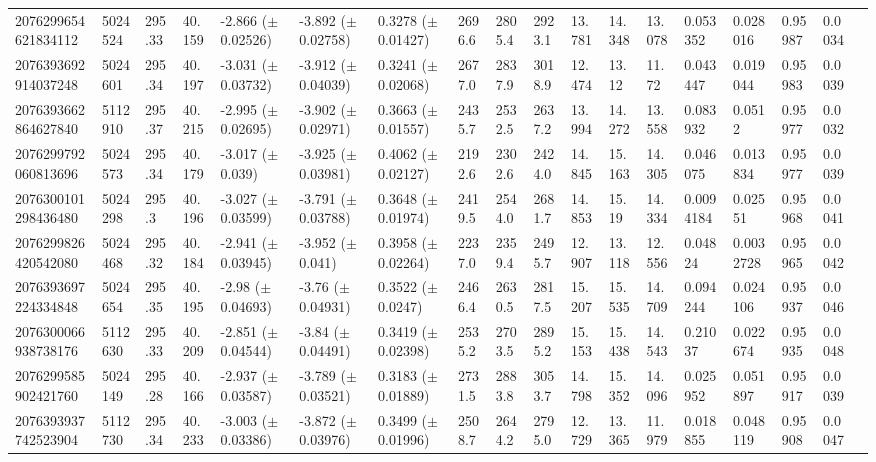 \begin{sidewaystable}[htbp]
{\begin{tabular}{llllllllllllllllll}
            2076299654621834112 & 5024524 & 295.33 & 40.159 & -2.866 ($\pm$ 0.02526) & -3.892 ($\pm$ 0.02758) & 0.3278 ($\pm$ 0.01427) & 2696.6 & 2805.4 & 2923.1 & 13.781 & 14.348 & 13.078 & 0.053352 & 0.028016 & 0.95987 & 0.0034 & \\
            2076393692914037248 & 5024601 & 295.34 & 40.197 & -3.031 ($\pm$ 0.03732) & -3.912 ($\pm$ 0.04039) & 0.3241 ($\pm$ 0.02068) & 2677.0 & 2837.9 & 3018.9 & 12.474 & 13.12 & 11.72 & 0.043447 & 0.019044 & 0.95983 & 0.0039 & \\
            2076393662864627840 & 5112910 & 295.37 & 40.215 & -2.995 ($\pm$ 0.02695) & -3.902 ($\pm$ 0.02971) & 0.3663 ($\pm$ 0.01557) & 2435.7 & 2532.5 & 2637.2 & 13.994 & 14.272 & 13.558 & 0.083932 & 0.0512 & 0.95977 & 0.0032 & \\
            2076299792060813696 & 5024573 & 295.34 & 40.179 & -3.017 ($\pm$ 0.039) & -3.925 ($\pm$ 0.03981) & 0.4062 ($\pm$ 0.02127) & 2192.6 & 2302.6 & 2424.0 & 14.845 & 15.163 & 14.305 & 0.046075 & 0.013834 & 0.95977 & 0.0039 & \\
            2076300101298436480 & 5024298 & 295.3 & 40.196 & -3.027 ($\pm$ 0.03599) & -3.791 ($\pm$ 0.03788) & 0.3648 ($\pm$ 0.01974) & 2419.5 & 2544.0 & 2681.7 & 14.853 & 15.19 & 14.334 & 0.0094184 & 0.02551 & 0.95968 & 0.0041 & \\
            2076299826420542080 & 5024468 & 295.32 & 40.184 & -2.941 ($\pm$ 0.03945) & -3.952 ($\pm$ 0.041) & 0.3958 ($\pm$ 0.02264) & 2237.0 & 2359.4 & 2495.7 & 12.907 & 13.118 & 12.556 & 0.04824 & 0.0032728 & 0.95965 & 0.0042 & \\
            2076393697224334848 & 5024654 & 295.35 & 40.195 & -2.98 ($\pm$ 0.04693) & -3.76 ($\pm$ 0.04931) & 0.3522 ($\pm$ 0.0247) & 2466.4 & 2630.5 & 2817.5 & 15.207 & 15.535 & 14.709 & 0.094244 & 0.024106 & 0.95937 & 0.0046 & \\
            2076300066938738176 & 5112630 & 295.33 & 40.209 & -2.851 ($\pm$ 0.04544) & -3.84 ($\pm$ 0.04491) & 0.3419 ($\pm$ 0.02398) & 2535.2 & 2703.5 & 2895.2 & 15.153 & 15.438 & 14.543 & 0.21037 & 0.022674 & 0.95935 & 0.0048 & \\
            2076299585902421760 & 5024149 & 295.28 & 40.166 & -2.937 ($\pm$ 0.03587) & -3.789 ($\pm$ 0.03521) & 0.3183 ($\pm$ 0.01889) & 2731.5 & 2883.8 & 3053.7 & 14.798 & 15.352 & 14.096 & 0.025952 & 0.051897 & 0.95917 & 0.0039 & \\
            2076393937742523904 & 5112730 & 295.34 & 40.233 & -3.003 ($\pm$ 0.03386) & -3.872 ($\pm$ 0.03976) & 0.3499 ($\pm$ 0.01996) & 2508.7 & 2644.2 & 2795.0 & 12.729 & 13.365 & 11.979 & 0.018855 & 0.048119 & 0.95908 & 0.0047 & \\

\end{tabular}}
\end{sidewaystable}
